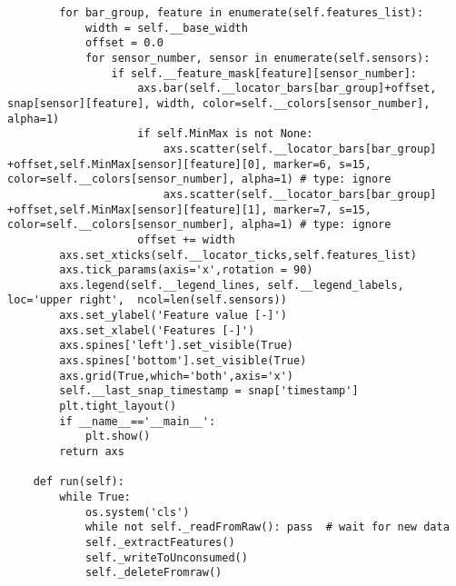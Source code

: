 \begin{verbatim}
        for bar_group, feature in enumerate(self.features_list):
            width = self.__base_width
            offset = 0.0          
            for sensor_number, sensor in enumerate(self.sensors):
                if self.__feature_mask[feature][sensor_number]:                        
                    axs.bar(self.__locator_bars[bar_group]+offset, snap[sensor][feature], width, color=self.__colors[sensor_number], alpha=1)
                    if self.MinMax is not None:
                        axs.scatter(self.__locator_bars[bar_group] +offset,self.MinMax[sensor][feature][0], marker=6, s=15, color=self.__colors[sensor_number], alpha=1) # type: ignore
                        axs.scatter(self.__locator_bars[bar_group] +offset,self.MinMax[sensor][feature][1], marker=7, s=15, color=self.__colors[sensor_number], alpha=1) # type: ignore
                    offset += width
        axs.set_xticks(self.__locator_ticks,self.features_list)
        axs.tick_params(axis='x',rotation = 90)
        axs.legend(self.__legend_lines, self.__legend_labels, loc='upper right',  ncol=len(self.sensors))
        axs.set_ylabel('Feature value [-]')
        axs.set_xlabel('Features [-]')
        axs.spines['left'].set_visible(True)
        axs.spines['bottom'].set_visible(True)
        axs.grid(True,which='both',axis='x')
        self.__last_snap_timestamp = snap['timestamp']
        plt.tight_layout()
        if __name__=='__main__':
            plt.show()
        return axs
                
    def run(self):
        while True:
            os.system('cls')
            while not self._readFromRaw(): pass  # wait for new data
            self._extractFeatures()
            self._writeToUnconsumed()
            self._deleteFromraw()    
\end{verbatim}
